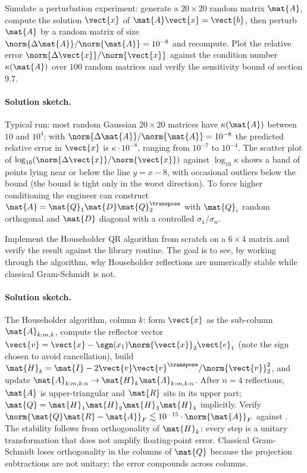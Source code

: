 \begin{exercise}
Simulate a perturbation experiment: generate a $20 \times 20$
random matrix $\mat{A}$, compute the solution $\vect{x}$ of
$\mat{A}\vect{x} = \vect{b}$, then perturb $\mat{A}$ by a random
matrix of size $\norm{\Delta\mat{A}}/\norm{\mat{A}} = 10^{-8}$ and
recompute. Plot the relative error $\norm{\Delta\vect{x}}/
\norm{\vect{x}}$ against the condition number $\kappa(\mat{A})$
over $100$ random matrices and verify the sensitivity bound of
section 9.7.
\end{exercise}

\paragraph{Solution sketch.}
Typical run: most random Gaussian $20 \times 20$ matrices have
$\kappa(\mat{A})$ between $10$ and $10^{4}$; with $\norm{\Delta
\mat{A}}/\norm{\mat{A}} = 10^{-8}$ the predicted relative error in
$\vect{x}$ is $\kappa \cdot 10^{-8}$, ranging from $10^{-7}$ to
$10^{-4}$. The scatter plot of $\log_{10}(\norm{\Delta\vect{x}}/
\norm{\vect{x}})$ against $\log_{10}\kappa$ shows a band of points
lying near or below the line $y = x - 8$, with occasional
outliers below the bound (the bound is tight only in the worst
direction). To force higher conditioning the engineer can
construct $\mat{A} = \mat{Q}_{1}\mat{D}\mat{Q}_{2}^{\transpose}$
with $\mat{Q}_{i}$ random orthogonal and $\mat{D}$ diagonal with a
controlled $\sigma_{1}/\sigma_{n}$.

\begin{exercise}
Implement the Householder QR algorithm from scratch on a $6 \times
4$ matrix and verify the result against the library routine. The
goal is to see, by working through the algorithm, why Householder
reflections are numerically stable while classical Gram-Schmidt
is not.
\end{exercise}

\paragraph{Solution sketch.}
The Householder algorithm, column $k$: form $\vect{x}$ as the
sub-column $\mat{A}_{k:m, k}$, compute the reflector vector $\vect{v}
= \vect{x} - \sgn(x_{1})\norm{\vect{x}}_{2}\vect{e}_{1}$ (note the
sign chosen to avoid cancellation), build $\mat{H}_{k} = \mat{I} -
2 \vect{v}\vect{v}^{\transpose}/\norm{\vect{v}}_{2}^{2}$, and
update $\mat{A}_{k:m, k:n} \to \mat{H}_{k}\mat{A}_{k:m, k:n}$. After
$n = 4$ reflections, $\mat{A}$ is upper-triangular and $\mat{R}$
sits in its upper part; $\mat{Q} = \mat{H}_{1}\mat{H}_{2}
\mat{H}_{3}\mat{H}_{4}$ implicitly. Verify $\norm{\mat{Q}\mat{R} -
\mat{A}}_{F} \lesssim 10^{-15} \cdot \norm{\mat{A}}_{F}$ against
. The stability follows from orthogonality of
$\mat{H}_{k}$: every step is a unitary transformation that does not
amplify floating-point error. Classical Gram-Schmidt loses
orthogonality in the columns of $\mat{Q}$ because the projection
subtractions are not unitary; the error compounds across columns.

